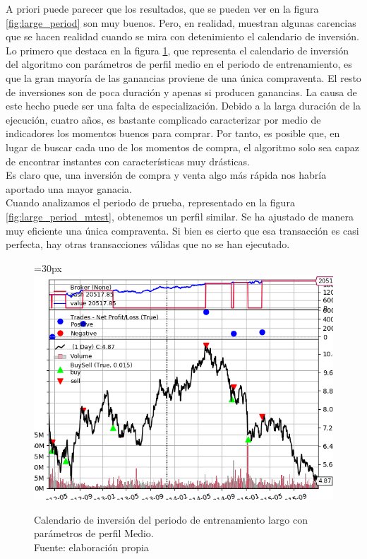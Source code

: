 A priori puede parecer que los resultados, que se pueden ver en la figura \ref{fig:large_period} son muy buenos. Pero, en realidad, muestran algunas carencias que se hacen realidad cuando se mira con detenimiento el calendario de inversi\'on.\\

Lo primero que destaca en la figura \ref{fig:large_period_mtrain}, que representa el calendario de inversi\'on del algoritmo con par\'ametros de perfil medio en el periodo de entrenamiento, es que la gran mayor\'ia de las ganancias proviene de una \'unica compraventa. El resto de inversiones son de poca duraci\'on y apenas si producen ganancias. La causa de este hecho puede ser una falta de especializaci\'on. Debido a la larga duraci\'on de la ejecuci\'on, cuatro a\~nos, es bastante complicado caracterizar por medio de indicadores los momentos buenos para comprar. Por tanto, es posible que, en lugar de buscar cada uno de los momentos de compra, el algoritmo solo sea capaz de encontrar instantes con caracter\'isticas muy dr\'asticas.\\

Es claro que, una inversi\'on de compra y venta algo m\'as r\'apida nos habr\'ia aportado una mayor ganacia.\\

Cuando analizamos el periodo de prueba, representado en la figura \ref{fig:large_period_mtest}, obtenemos un perfil similar. Se ha ajustado de manera muy eficiente una \'unica compraventa. Si bien es cierto que esa transacci\'on es casi perfecta, hay otras transacciones v\'alidas que no se han ejecutado.\\

     	\begin{figure}[H]
     		\centering\leftskip=30px
     		\includegraphics[scale=0.70]{imagenes/L_Medium_train.png}
     		\caption[Calendario de inversi\'on del periodo de entrenamiento largo.]{Calendario de inversi\'on del periodo de entrenamiento largo con par\'ametros de perfil Medio.\\ Fuente: elaboraci\'on propia}
     		\label{fig:large_period_mtrain}
     	\end{figure}
     	
